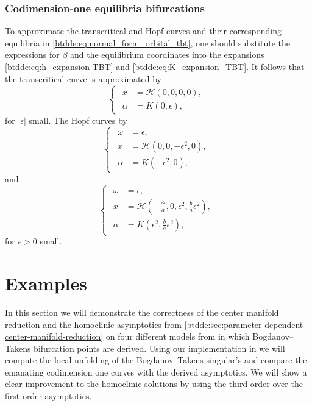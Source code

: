 \subsubsection{Codimension-one equilibria bifurcations}
To approximate the transcritical and Hopf curves and their corresponding equilibria in
\cref{btdde:eq:normal_form_orbital_tbt}, one should substitute the expressions for $\beta$
and the equilibrium coordinates into the expansions \cref{btdde:eq:h_expansion-TBT} and
\cref{btdde:eq:K_expansion_TBT}. It follows that the transcritical curve is approximated by 
\begin{equation*}
\begin{cases}
\begin{aligned}
    x &= \mathcal H\left(0,0,0,0\right), \\
    \alpha &= K(0,\epsilon),
\end{aligned}
\end{cases}
\end{equation*}
for $|\epsilon|$ small. The Hopf curves by
\begin{equation*}
\begin{cases}
\begin{aligned}
    \omega &= \epsilon, \\
    x &= \mathcal H\left(0,0,-\epsilon^2,0\right), \\
    \alpha &= K\left(-\epsilon^2,0\right),
\end{aligned}
\end{cases}
\end{equation*}
and
\begin{equation*}
\begin{cases}
\begin{aligned}
    \omega &= \epsilon, \\
    x &= \mathcal H\left(-\frac{\epsilon^2}{a},0,\epsilon^2,\frac ba\epsilon^2\right), \\
    \alpha &= K\left(\epsilon^2,\frac ba\epsilon^2\right),
\end{aligned}
\end{cases}
\end{equation*}
for $\epsilon > 0$ small.

\section{Examples}
\label{btdde:sec:Examples}

In this section we will demonstrate the correctness of the center manifold
reduction and the homoclinic asymptotics from
\cref{btdde:sec:parameter-dependent-center-manifold-reduction} on four different
models from
\cite{Jiao2021,giannakopoulos2001bifurcations,jiang2007bogdanov,dong2013bogdanov}
in which Bogdanov--Takens bifurcation points are derived. Using our
implementation in \DDEBIFTOOL we will compute the local unfolding of the
Bogdanov--Takens singular's and compare the emanating codimension one curves
with the derived asymptotics.  We will show a clear improvement to the
homoclinic solutions by using the third-order over the first order asymptotics. 

